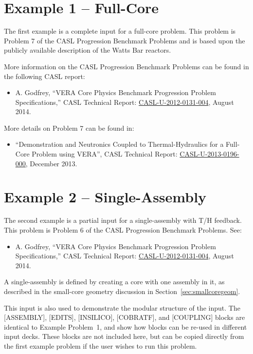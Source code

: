 \documentclass{report}
\numberwithin{equation}{section}
\begin{document}
\section{Example 1 -- Full-Core}
The first example is a complete input for a full-core problem.
This problem is Problem 7 of the CASL Progression Benchmark Problems and
is based upon the publicly available description of the Watts Bar reactors.

More information on the CASL Progression Benchmark Problems can be found in the following CASL report:
\begin{itemize}
\item A. Godfrey, ``VERA Core Physics Benchmark Progression Problem Specifications,''
CASL Technical Report: \href{http://www.casl.gov/docs/CASL-U-2012-0131-004.pdf}{CASL-U-2012-0131-004}, August 2014.
\end{itemize}

More details on Problem 7 can be found in:
\begin{itemize}
\item ``Demonstration and Neutronics Coupled to Thermal-Hydraulics for a Full-Core Problem using VERA'',
CASL Technical Report: \href{http://www.casl.gov/docs/CASL-U-2013-0196-000.pdf}{CASL-U-2013-0196-000}, December 2013.
\end{itemize}



\section{Example 2 -- Single-Assembly}
The second example is a partial input for a single-assembly with T/H feedback.
This problem is Problem 6 of the CASL Progression Benchmark Problems.  See:
\begin{itemize}
\item A. Godfrey, ``VERA Core Physics Benchmark Progression Problem Specifications,''                                      
CASL Technical Report: \href{http://www.casl.gov/docs/CASL-U-2012-0131-004.pdf}{CASL-U-2012-0131-004}, August 2014.
\end{itemize}

A single-assembly is defined by creating a core with one assembly in it, 
as described in the small-core geometry discussion in Section~\ref{sec:smallcoregeom}.

This input is also used to demonstrate the modular structure of the input.  The [ASSEMBLY],  [EDITS], [INSILICO],
[COBRATF], and [COUPLING] blocks are identical to Example Problem~1, and show how blocks
can be re-used in different input decks.  
These blocks are not included here, but can be copied directly from the first
example problem if the user wishes to run this problem.
\end{document}
